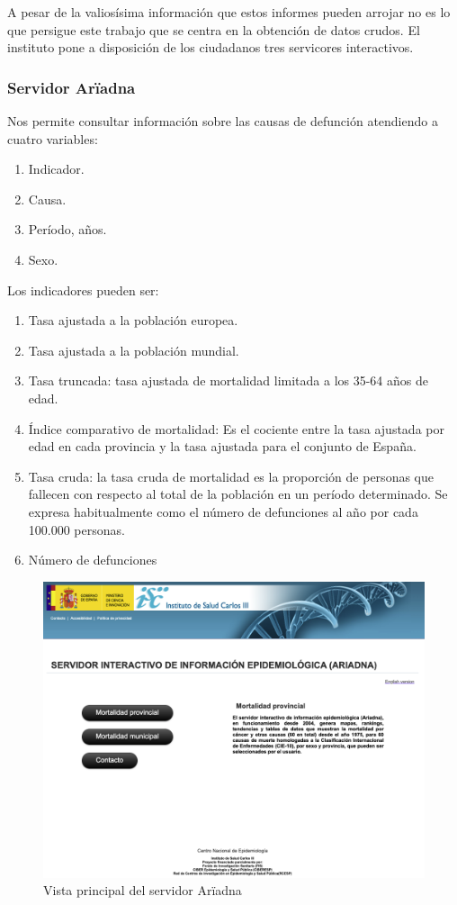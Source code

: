 A pesar de la valiosísima información que estos informes pueden arrojar no es lo que persigue este trabajo que se
centra en la obtención de datos crudos. El instituto pone a disposición de los ciudadanos tres servicores interactivos.

\subsubsection{Servidor Arïadna}
Nos permite consultar información sobre las causas de defunción atendiendo a cuatro variables:
\begin{enumerate}
  \item Indicador.
  \item Causa.
  \item Período, años.
  \item Sexo.
\end{enumerate}

Los indicadores pueden ser:
\begin{enumerate}
  \item Tasa ajustada a la población europea.
  \item Tasa ajustada a la población mundial.
  \item Tasa truncada: tasa ajustada de mortalidad limitada a los 35-64 años de edad.
  \item Índice comparativo de mortalidad: Es el cociente entre la tasa ajustada por edad en cada provincia y la tasa
  ajustada para el conjunto de España.
  \item Tasa cruda: la tasa cruda de mortalidad es la proporción de personas que fallecen con respecto al total
  de la población en un período determinado. Se expresa habitualmente como el número de defunciones al año
  por cada 100.000 personas.
  \item Número de defunciones
\end{enumerate}

\begin{figure}[]
	\centering
	\includegraphics[scale=0.5]{doc/logos/imgs/ariadna1.png}
	\caption{ \cite{ariadna} Vista principal del servidor Arïadna }
    \label{fig:worst_f_value}
\end{figure}

